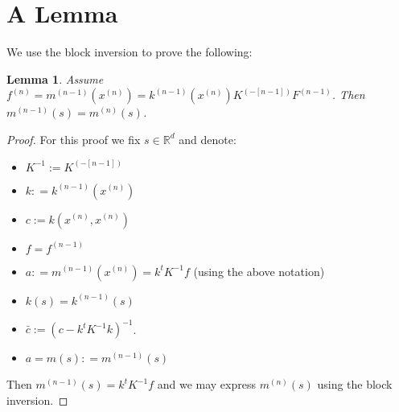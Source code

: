 \documentclass[paper=a4, fontsize=11pt]{scrartcl} %
\newtheorem{lemma}[theorem]{Lemma}
\numberwithin{equation}{section} %
\numberwithin{figure}{section} %
\numberwithin{table}{section} %
\newcommand{\rr}{\mathbb{R}}
\newcommand{\xn}{x^{(n)}} %
\newcommand{\mn}{m^{(n)}}
\newcommand{\mnm}{m^{(n-1)}}
\newcommand{\fn}{f^{(n)}} %
\newcommand{\fnm}{f^{(n-1)}}
\newcommand{\Fnm}{F^{(n-1)}}
\newcommand{\knm}{k^{(n-1)}}
\newcommand{\Kinvnm}{K^{(-[n-1])}}
\newcommand{\Kinv}{K^{-1}} %
\begin{document}
\section{A Lemma}
We use the block inversion to prove the following:
\begin{lemma}
Assume $\fn = \mnm(\xn) =  \knm(\xn)K^{(-[n-1])}\Fnm$. Then $\mnm(s) = \mn(s)$.
\end{lemma}
\begin{proof}
 For this proof we fix $s\in \rr ^{d}$ and denote:
\begin{itemize}
 \item $\Kinv := \Kinvnm$ 
 \item $k : = \knm(\xn)$
 \item $c := k(\xn,\xn)$
 \item $f = \fnm$ 
 \item $a : = \mnm(\xn) = k^t\Kinv f$ (using the above notation)
 \item $k(s) = \knm(s)$
 \item $\bar{c} := (c - k^t\Kinv k)^{-1}$. 
 \item $a = m(s) : = \mnm(s)$
\end{itemize}
Then $\mnm(s) = k^t\Kinv f$ and we may express $\mn(s)$ using the block inversion.



\end{proof}
\end{document}
